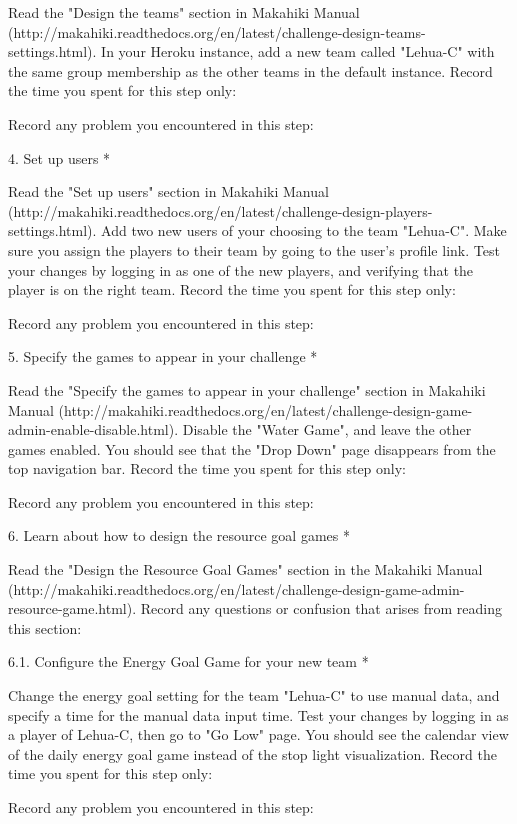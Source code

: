 Read the "Design the teams" section in Makahiki Manual (http://makahiki.readthedocs.org/en/latest/challenge-design-teams-settings.html). In your Heroku instance, add a new team called "Lehua-C" with the same group membership as the other teams in the default instance. Record the time you spent for this step only:

Record any problem you encountered in this step:

4. Set up users *

Read the "Set up users" section in Makahiki Manual (http://makahiki.readthedocs.org/en/latest/challenge-design-players-settings.html). Add two new users of your choosing to the team "Lehua-C". Make sure you assign the players to their team by going to the user's profile link. Test your changes by logging in as one of the new players, and verifying that the player is on the right team. Record the time you spent for this step only:

Record any problem you encountered in this step:

5. Specify the games to appear in your challenge *

Read the "Specify the games to appear in your challenge" section in Makahiki Manual (http://makahiki.readthedocs.org/en/latest/challenge-design-game-admin-enable-disable.html). Disable the "Water Game", and leave the other games enabled. You should see that the "Drop Down" page disappears from the top navigation bar. Record the time you spent for this step only:

Record any problem you encountered in this step:

6. Learn about how to design the resource goal games *

Read the "Design the Resource Goal Games" section in the Makahiki Manual (http://makahiki.readthedocs.org/en/latest/challenge-design-game-admin-resource-game.html). Record any questions or confusion that arises from reading this section:

6.1. Configure the Energy Goal Game for your new team *

Change the energy goal setting for the team "Lehua-C" to use manual data, and specify a time for the manual data input time. Test your changes by logging in as a player of Lehua-C, then go to "Go Low" page. You should see the calendar view of the daily energy goal game instead of the stop light visualization. Record the time you spent for this step only:

Record any problem you encountered in this step:

